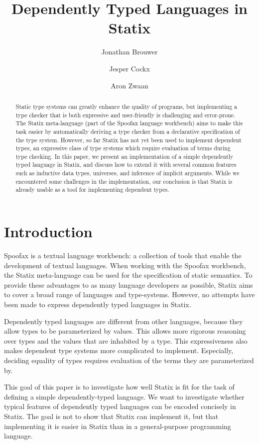 \documentclass[a4paper,UKenglish,cleveref, autoref, thm-restate]{oasics-v2021}
\title{Dependently Typed Languages in Statix}
\author{Jonathan Brouwer}{Delft University of Technology, The Netherlands \and \url{http://jonathanb.nl}}{j.t.brouwer@student.tudelft.nl}{}{}
\author{Jesper Cockx}{Delft University of Technology, The Netherlands \and \url{http://jesper.sikanda.be}}{j.g.h.cockx@tudelft.nl}{}{}
\author{Aron Zwaan}{Delft University of Technology, The Netherlands \and \url{http://aronzwaan.github.io}}{a.s.zwaan@tudelft.nl}{}{}
\begin{document}
\maketitle

\begin{abstract}
Static type systems can greatly enhance the quality of programs, but implementing a type checker that is both expressive and user-friendly is challenging and error-prone. The Statix meta-language (part of the Spoofax language workbench) aims to make this task easier by automatically deriving a type checker from a declarative specification of the type system. However, so far Statix has not yet been used to implement dependent types, an expressive class of type systems which require evaluation of terms during type checking. In this paper, we present an implementation of a simple dependently typed language in Statix, and discuss how to extend it with several common features such as inductive data types, universes, and inference of implicit arguments. While we encountered some challenges in the implementation, our conclusion is that Statix is already usable as a tool for implementing dependent types.
\end{abstract}

\section{Introduction}

Spoofax is a textual language workbench: \label{key}a collection of tools that enable the development of textual languages\cite{spoofax}. When working with the Spoofax workbench, the Statix meta-language can be used for the specification of static semantics. To provide these advantages to as many language developers as possible, Statix aims to cover a broad range of languages and type-systems. However, no attempts have been made to express dependently typed languages in Statix. 

Dependently typed languages are different from other languages, because they allow types to be parameterized by values. This allows more rigorous reasoning over types and the values that are inhabited by a type. This expressiveness also makes dependent type systems more complicated to implement. Especially, deciding equality of types requires evaluation of the terms they are parameterized by. 

This goal of this paper is to investigate how well Statix is fit for the task of defining a simple dependently-typed language. We want to investigate whether typical features of dependently typed languages can be encoded concisely in Statix. The goal is not to show that Statix can implement it, but that implementing it is easier in Statix than in a general-purpose programming language. 
\end{document}
